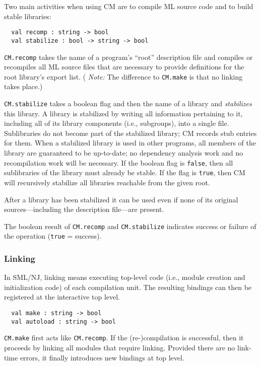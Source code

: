 \documentclass[titlepage,letterpaper]{article}
\begin{document}
Two main activities when using CM are to compile ML source code and to
build stable libraries:

\begin{verbatim}
  val recomp : string -> bool
  val stabilize : bool -> string -> bool
\end{verbatim}

{\tt CM.recomp} takes the name of a program's ``root'' description
file and compiles or recompiles all ML source files that are necessary
to provide definitions for the root library's export list.  ({\em
Note:} The difference to {\tt CM.make} is that no linking takes
place.)

{\tt CM.stabilize} takes a boolean flag and then the name of a library
and {\em stabilizes} this library.  A library is stabilized by writing
all information pertaining to it, including all of its library
components (i.e., subgroups), into a single file.  Sublibraries do not
become part of the stabilized library; CM records stub entries for them.
When a stabilized library is used in other programs, all members of
the library are guaranteed to be up-to-date; no dependency analysis
work and no recompilation work will be necessary.  If the boolean flag
is {\tt false}, then all sublibraries of the library must already be
stable.  If the flag is {\tt true}, then CM will recursively stabilize
all libraries reachable from the given root.

After a library has been stabilized it can be used even if none of its
original sources---including the description file---are present.

The boolean result of {\tt CM.recomp} and {\tt CM.stabilize} indicates
success or failure of the operation ({\tt true} = success).

\subsubsection*{Linking}

In SML/NJ, linking means executing top-level code (i.e., module
creation and initialization code) of each compilation unit.  The
resulting bindings can then be registered at the interactive top
level.

\begin{verbatim}
  val make : string -> bool
  val autoload : string -> bool
\end{verbatim}

{\tt CM.make} first acts like {\tt CM.recomp}.  If the
(re-)compilation is successful, then it proceeds by linking all
modules that require linking.  Provided there are no link-time errors,
it finally introduces new bindings at top level.
\end{document}
